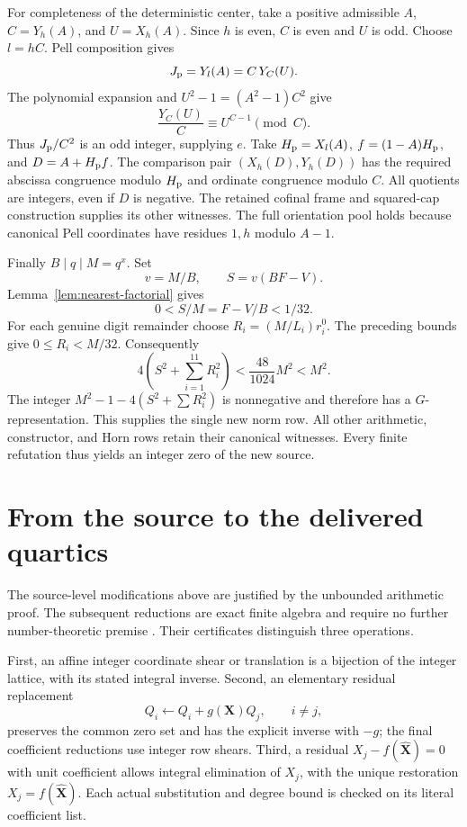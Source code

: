 For completeness of the deterministic center, take a positive
admissible \(A\), \(C=Y_h(A)\), and \(U=X_h(A)\).
Since \(h\) is even, \(C\) is even and \(U\) is odd.
Choose \(l=hC\). Pell composition gives
\[
 J_{\rm p}=Y_l(A)=C\,Y_C(U).
\]
The polynomial expansion and
\(U^2-1=(A^2-1)C^2\) give
\[
 \frac{Y_C(U)}{C}\equiv U^{C-1}\pmod C.
\]
Thus \(J_{\rm p}/C^2\) is an odd integer, supplying \(e\).
Take \(H_{\rm p}=X_l(A)\), \(f=(1-A)H_{\rm p}\), and
\(D=A+H_{\rm p}f\). The comparison pair
\((X_h(D),Y_h(D))\) has the required abscissa congruence modulo
\(H_{\rm p}\) and ordinate congruence modulo \(C\).
All quotients are integers, even if \(D\) is negative.
The retained cofinal frame and squared-cap construction supplies its
other witnesses. The full orientation pool holds because canonical
Pell coordinates have residues \(1,h\) modulo \(A-1\).

Finally \(B\mid q\mid M=q^x\). Set
\[
 v=M/B,\qquad S=v(BF-V).
\]
Lemma~\ref{lem:nearest-factorial} gives
\[
 0<S/M=F-V/B<1/32.
\]
For each genuine digit remainder choose
\(R_i=(M/L_i)r_i^0\). The preceding bounds give
\(0\le R_i<M/32\). Consequently
\[
 4\left(S^2+\sum_{i=1}^{11}R_i^2\right)
       <\frac{48}{1024}M^2<M^2.
\]
The integer
\(M^2-1-4(S^2+\sum R_i^2)\) is nonnegative and therefore
has a \(G\)-representation. This supplies the single new norm row.
All other arithmetic, constructor, and Horn rows retain their canonical
witnesses. Every finite refutation thus yields an integer zero of
the new source.

\section{From the source to the delivered quartics}

The source-level modifications above are justified by the unbounded
arithmetic proof. The subsequent reductions are exact finite algebra
and require no further number-theoretic premise \cite{residual}.
Their certificates distinguish three operations.

First, an affine integer coordinate shear or translation is a bijection
of the integer lattice, with its stated integral inverse.
Second, an elementary residual replacement
\[
 Q_i\longleftarrow Q_i+g(\mathbf X)Q_j,\qquad i\ne j,
\]
preserves the common zero set and has the explicit inverse with
\(-g\); the final coefficient reductions use integer row shears.
Third, a residual \(X_j-f(\widehat{\mathbf X})=0\) with unit
coefficient allows integral elimination of \(X_j\), with the unique
restoration \(X_j=f(\widehat{\mathbf X})\). Each actual substitution
and degree bound is checked on its literal coefficient list.

